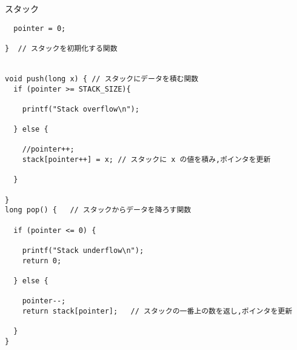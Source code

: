 \documentclass[a4j,titlepage]{jarticle}
\begin{document}
\begin{breakitembox}[l]{スタック}
\begin{verbatim}
  pointer = 0;
  
}  // スタックを初期化する関数


void push(long x) { // スタックにデータを積む関数
  if (pointer >= STACK_SIZE){

    printf("Stack overflow\n");

  } else {

    //pointer++;
    stack[pointer++] = x; // スタックに x の値を積み,ポインタを更新

  }

}
long pop() {   // スタックからデータを降ろす関数
  
  if (pointer <= 0) {

    printf("Stack underflow\n");
    return 0;

  } else {

    pointer--;
    return stack[pointer];   // スタックの一番上の数を返し,ポインタを更新

  }
}


\end{verbatim}
\end{breakitembox}
\end{document}
